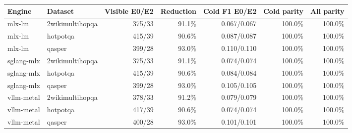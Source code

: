 \begin{tabular}{llrrrrr}
\toprule
Engine & Dataset & Visible E0/E2 & Reduction & Cold F1 E0/E2 & Cold parity & All parity \\
\midrule
mlx-lm & 2wikimultihopqa & 375/33 & 91.1\% & 0.067/0.067 & 100.0\% & 100.0\% \\
mlx-lm & hotpotqa & 415/39 & 90.6\% & 0.087/0.087 & 100.0\% & 100.0\% \\
mlx-lm & qasper & 399/28 & 93.0\% & 0.110/0.110 & 100.0\% & 100.0\% \\
sglang-mlx & 2wikimultihopqa & 375/33 & 91.1\% & 0.074/0.074 & 100.0\% & 100.0\% \\
sglang-mlx & hotpotqa & 415/39 & 90.6\% & 0.084/0.084 & 100.0\% & 100.0\% \\
sglang-mlx & qasper & 399/28 & 93.0\% & 0.105/0.105 & 100.0\% & 100.0\% \\
vllm-metal & 2wikimultihopqa & 378/33 & 91.2\% & 0.079/0.079 & 100.0\% & 100.0\% \\
vllm-metal & hotpotqa & 417/39 & 90.6\% & 0.074/0.074 & 100.0\% & 100.0\% \\
vllm-metal & qasper & 400/28 & 93.0\% & 0.101/0.101 & 100.0\% & 100.0\% \\
\bottomrule
\end{tabular}
